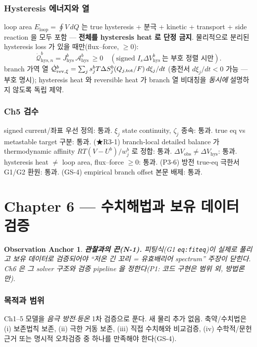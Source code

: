\documentclass[11pt,a4paper]{article}
\newtheorem*{anchorbox}{Observation Anchor}
\newcommand{\hys}{\mathrm{hys}}\newcommand{\pol}{\mathrm{pol}}\newcommand{\AL}[1]{\textsf{[AL-#1]}}
\begin{document}
\section{Hysteresis 에너지와 열}\label{sec:ch5_heat}
loop area $E_\mathrm{loop}=\oint V\,dQ$ 는 true hysteresis + 분극 + kinetic + transport + side
reaction 을 모두 포함 — \textbf{전체를 hysteresis heat 로 단정 금지}. 물리적으로 분리된 hysteresis loss
가 있을 때만(flux--force, $\ge0$):
\begin{equation}
\dot{\mathcal Q}_{\hys,n}^b=J_\hys^b\,\mathcal A_\hys^b\ \ge0\quad(\text{signed }I_s\Delta V_\hys^b\ \text{는 부호 정렬 시만}).
\label{eq:ch5_hysheat}
\end{equation}
branch 가역 열 $\dot{\mathcal Q}_{\mathrm{rev},\xi}^b=\sum_j s_j^b T\Delta S_j^b (Q_{j,\mathrm{tot}}/F)\,d\xi_j/dt$ (충전서
$d\xi_j/dt<0$ 가능 — 부호 명시); hysteresis heat 와 reversible heat 가 branch 열 비대칭을 \emph{동시에}
설명하지 않도록 독립 제약.

\section{Ch5 검수}\label{sec:ch5_check}
{\small signed current/좌표 우선 정의: 통과. $\xi_j$ state continuity, $\zeta_j$ 종속: 통과.
true eq vs metastable target 구분: 통과. (★R3-1) branch-local detailed balance 가 thermodynamic
affinity $RT(V-U^b)/w_j^b$ 로 정합: 통과. $\Delta V_\mathrm{obs}\ne\Delta V_\hys$: 통과. hysteresis heat
$\ne$ loop area, flux--force $\ge0$: 통과. (P3-6) 방전 true-eq 극한서 G1/G2 환원: 통과. (GS-4)
empirical branch offset 본문 배제: 통과.}

\part*{Chapter 6 — 수치해법과 보유 데이터 검증}
\setcounter{section}{0}

\begin{anchorbox}
\textbf{관찰과의 끈(N-1).} 피팅식(G1 \texttt{eq:fiteq})이 \emph{실제로 풀리고} 보유 데이터로
\emph{검증}되어야 ``저온 긴 꼬리 = 유효배리어 spectrum'' 주장이 닫힌다. Ch6 은 그 solver 구조와
검증 pipeline 을 정한다(P1: 코드 구현은 범위 외, 방법론만).
\end{anchorbox}

\section{목적과 범위}\label{sec:ch6_scope}
Ch1--5 모델을 \emph{음극 방전$\cdot$등온} 1차 검증으로 푼다. 새 물리 추가 없음. 축약/수치법은
(i) 보존법칙 보존, (ii) 극한 거동 보존, (iii) 직접 수치해와 비교검증, (iv) 수학적/문헌 근거 또는
명시적 오차검증 중 하나를 만족해야 한다(GS-4).
\end{document}
